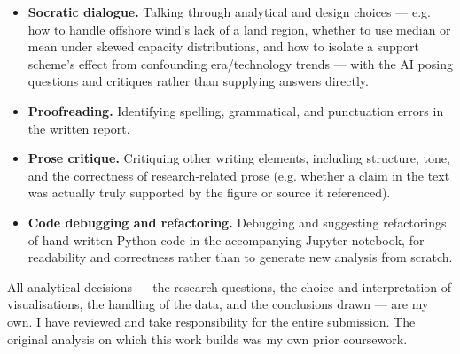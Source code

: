\documentclass[11pt]{article}
\begin{document}
\begin{itemize}
  \item \textbf{Socratic dialogue.} Talking through analytical and design choices --- e.g. how to handle offshore wind's lack of a land region, whether to use median or mean under skewed capacity distributions, and how to isolate a support scheme's effect from confounding era/technology trends --- with the AI posing questions and critiques rather than supplying answers directly.
  
  \item \textbf{Proofreading.} Identifying spelling, grammatical, and punctuation errors in the written report.
  
  \item \textbf{Prose critique.} Critiquing other writing elements, including structure, tone, and the correctness of research-related prose (e.g. whether a claim in the text was actually truly supported by the figure or source it referenced).
  
  \item \textbf{Code debugging and refactoring.} Debugging and suggesting refactorings of hand-written Python code in the accompanying Jupyter notebook, for readability and correctness rather than to generate new analysis from scratch.
\end{itemize}

All analytical decisions --- the research questions, the choice and interpretation of
visualisations, the handling of the data, and the conclusions drawn --- are my own. I have reviewed
and take responsibility for the entire submission. The original analysis on which this work builds
was my own prior coursework.
\end{document}
